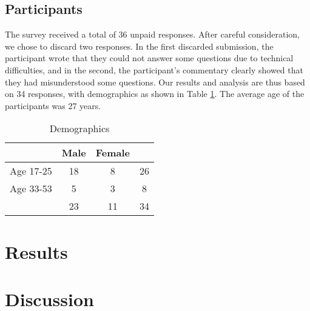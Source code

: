     \subsection{Participants} \label{subsec:explor:survey:participants}
    The survey received a total of 36 unpaid responses. After careful consideration, we chose to discard two responses. In the first discarded submission, the participant wrote that they could not answer some questions due to technical difficulties, and in the second, the participant's commentary clearly showed that they had misunderstood some questions. Our results and analysis are thus based on 34 responses, with demographics as shown in Table \ref{table:explor:demographics}. The average age of the participants was 27 years.

        \begin{table}[h!]
        \centering
            \begin{tabular}{|c|c c|c|} 
            \hline
                      & Male & Female &    \\
            \hline
            Age 17-25 &   18 &      8 & 26 \\
            Age 33-53 &    5 &      3 &  8 \\
            \hline
                      &   23 &     11 & 34 \\
            \hline
            \end{tabular}
        \caption{Demographics}
        \label{table:explor:demographics}
        \end{table}

    

\section{Results} \label{sec:explor:results}
\todo{}

\section{Discussion} \label{sec:explor:discussion}
\todo{}